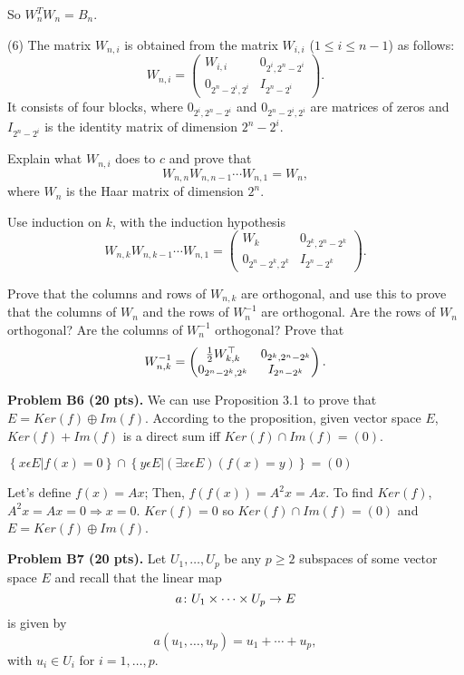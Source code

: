 \documentclass[12pt]{article}
\begin{document}
So $W_n^TW_n = B_n$.




\medskip
(6)
The matrix $W_{n, i}$ is obtained from the matrix $W_{i, i}$ 
($1 \leq i \leq n - 1$) as follows:
\[
W_{n, i} = 
\begin{pmatrix}
 W_{i, i} & 0_{2^{i}, 2^{n} - 2^{i}} \\
0_{2^{n}- 2^{i}, 2^i} & I_{2^{n} - 2^{i}}
\end{pmatrix}.
\]
It consists of four blocks,
where  $0_{2^{i}, 2^{n} - 2^{i}}$ and $0_{2^{n} - 2^{i}, 2^i}$
are matrices of zeros and $I_{2^{n} - 2^{i}}$ is the identity matrix of
dimension $2^{n} - 2^i$.

\medskip
Explain what $W_{n, i}$ does to $c$ and prove that
\[
W_{n, n} W_{n, n - 1} \cdots W_{n, 1} = W_n,
\]
where $W_n$ is the Haar matrix of dimension $2^n$.

\medskip
\hint
Use induction on $k$,  with the induction hypothesis
\[
W_{n, k} W_{n, k - 1}\cdots W_{n, 1} = 
\begin{pmatrix}
 W_{k} & 0_{2^{k}, 2^{n} - 2^{k}} \\
0_{2^{n}- 2^{k}, 2^k} &  I_{2^{n} - 2^{k}}
\end{pmatrix}.
\]


\medskip
Prove that the columns and rows of $W_{n, k}$ are orthogonal, and use
this to prove that the columns of $W_n$ and the rows of
$W_n^{-1}$ are orthogonal. 
Are the rows of  $W_n$ orthogonal?
Are the columns of  $W_n^{-1}$ orthogonal?
Prove that
\[
W_{n, k}^{-1} = 
\begin{pmatrix}
 \frac{1}{2}W_{k, k}^{\top} & 0_{2^{k}, 2^{n} - 2^{k}} \\
0_{2^{n}- 2^{k}, 2^k} &  I_{2^{n} - 2^{k}}
\end{pmatrix}.
\]


\vspace {0.25cm}\noindent
{\bf Problem B6 (20 pts).}
We can use Proposition 3.1 to prove that $E=Ker(f)\oplus Im(f)$.
According to the proposition, given vector space $E$, $Ker(f)+Im(f)$
is a direct sum iff $Ker(f)\cap Im(f)=(0)$. 
 
$\left\{ x\epsilon E|f(x)=0\right\} \cap\left\{ y\epsilon E|(\exists x\epsilon E)(f(x)=y)\right\} =(0)$

Let's define $f(x)=Ax$; Then, $f(f(x))=A^{2}x=Ax$. To find $Ker(f)$,
$A^{2}x=Ax=0\Rightarrow x=0$.
$Ker(f)=0$ so $Ker(f)\cap Im(f)=(0)$ and $E=Ker(f)\oplus Im(f)$.



\vspace {0.25cm}\noindent
{\bf Problem B7 (20 pts).}
Let $U_1, \ldots, U_p$ be any  $p \geq 2$  subspaces of some vector
space $E$ and recall that the linear map
\[
a\colon U_1\times \cdots \times U_p\rightarrow E
\]
is given by
\[
a(u_1, \ldots, u_p) = u_1 + \cdots + u_p,
\]
with $u_i \in U_i$ for $i = 1, \ldots, p$.
\end{document}
